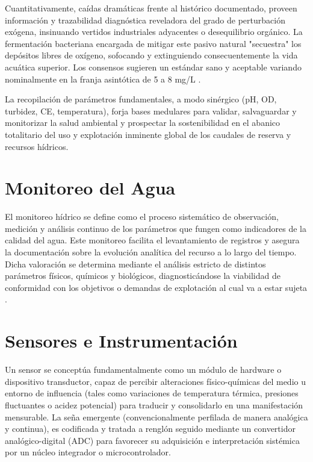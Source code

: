 Cuantitativamente, caídas dramáticas frente al histórico documentado, proveen información y trazabilidad diagnóstica reveladora del grado de perturbación exógena, insinuando vertidos industriales adyacentes o desequilibrio orgánico. La fermentación bacteriana encargada de mitigar este pasivo natural "secuestra" los depósitos libres de oxígeno, sofocando y extinguiendo consecuentemente la vida acuática superior. Los consensos sugieren un estándar sano y aceptable variando nominalmente en la franja asintótica de 5 a 8 mg/L \cite{swamp2023}.

La recopilación de parámetros fundamentales, a modo sinérgico (pH, OD, turbidez, CE, temperatura), forja bases medulares para validar, salvaguardar y monitorizar la salud ambiental y prospectar la sostenibilidad en el abanico totalitario del uso y explotación inminente global de los caudales de reserva y recursos hídricos.

\section{Monitoreo del Agua}
El monitoreo hídrico se define como el proceso sistemático de observación, medición y análisis continuo de los parámetros que fungen como indicadores de la calidad del agua. Este monitoreo facilita el levantamiento de registros y asegura la documentación sobre la evolución analítica del recurso a lo largo del tiempo. Dicha valoración se determina mediante el análisis estricto de distintos parámetros físicos, químicos y biológicos, diagnosticándose la viabilidad de conformidad con los objetivos o demandas de explotación al cual va a estar sujeta \cite{monitoreo2023}.

\section{Sensores e Instrumentación}
\label{sec:marco_sensores}

Un sensor se conceptúa fundamentalmente como un módulo de hardware o dispositivo transductor, capaz de percibir alteraciones físico-químicas del medio u entorno de influencia (tales como variaciones de temperatura térmica, presiones fluctuantes o acidez potencial) para traducir y consolidarlo en una manifestación mensurable. La seña emergente (convencionalmente perfilada de manera analógica y continua), es codificada y tratada a renglón seguido mediante un convertidor analógico-digital (ADC) para favorecer su adquisición e interpretación sistémica por un núcleo integrador o microcontrolador.

